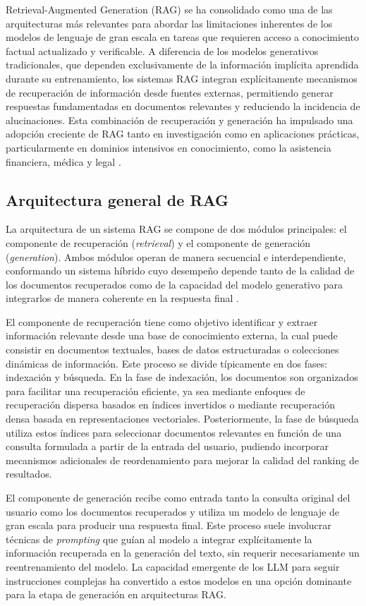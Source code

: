 \documentclass[
	spanish, %
	letterpaper, oneside
]{book}
\begin{document}
Retrieval-Augmented Generation (RAG) se ha consolidado como una de las arquitecturas más relevantes para abordar las limitaciones inherentes de los modelos de lenguaje de gran escala en tareas que requieren acceso a conocimiento factual actualizado y verificable. A diferencia de los modelos generativos tradicionales, que dependen exclusivamente de la información implícita aprendida durante su entrenamiento, los sistemas RAG integran explícitamente mecanismos de recuperación de información desde fuentes externas, permitiendo generar respuestas fundamentadas en documentos relevantes y reduciendo la incidencia de alucinaciones. Esta combinación de recuperación y generación ha impulsado una adopción creciente de RAG tanto en investigación como en aplicaciones prácticas, particularmente en dominios intensivos en conocimiento, como la asistencia financiera, médica y legal \cite{yu2024rag_survey}.

\subsection{Arquitectura general de RAG}

La arquitectura de un sistema RAG se compone de dos módulos principales: el componente de recuperación (\emph{retrieval}) y el componente de generación (\emph{generation}). Ambos módulos operan de manera secuencial e interdependiente, conformando un sistema híbrido cuyo desempeño depende tanto de la calidad de los documentos recuperados como de la capacidad del modelo generativo para integrarlos de manera coherente en la respuesta final \cite{yu2024rag_survey}.

El componente de recuperación tiene como objetivo identificar y extraer información relevante desde una base de conocimiento externa, la cual puede consistir en documentos textuales, bases de datos estructuradas o colecciones dinámicas de información. Este proceso se divide típicamente en dos fases: indexación y búsqueda. En la fase de indexación, los documentos son organizados para facilitar una recuperación eficiente, ya sea mediante enfoques de recuperación dispersa basados en índices invertidos o mediante recuperación densa basada en representaciones vectoriales. Posteriormente, la fase de búsqueda utiliza estos índices para seleccionar documentos relevantes en función de una consulta formulada a partir de la entrada del usuario, pudiendo incorporar mecanismos adicionales de reordenamiento para mejorar la calidad del ranking de resultados.

El componente de generación recibe como entrada tanto la consulta original del usuario como los documentos recuperados y utiliza un modelo de lenguaje de gran escala para producir una respuesta final. Este proceso suele involucrar técnicas de \emph{prompting} que guían al modelo a integrar explícitamente la información recuperada en la generación del texto, sin requerir necesariamente un reentrenamiento del modelo. La capacidad emergente de los LLM para seguir instrucciones complejas ha convertido a estos modelos en una opción dominante para la etapa de generación en arquitecturas RAG.
\end{document}

